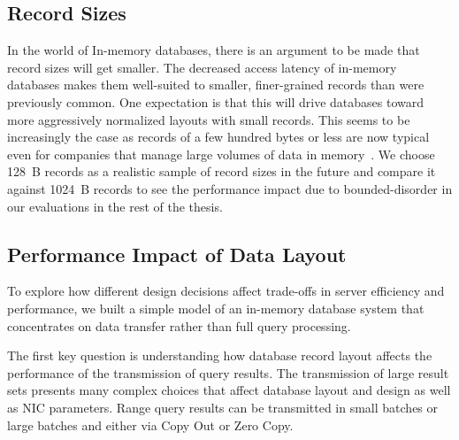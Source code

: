 \subsection{Record Sizes}
In the world of In-memory databases, there is an argument to be made that record sizes will get smaller.
The decreased access latency of in-memory databases makes them well-suited to smaller, finer-grained records
than were previously common. One expectation is that this will drive databases
toward more aggressively normalized layouts with small records. This
seems to be increasingly the case as records of a few hundred bytes or less
are now typical even for companies that manage large volumes of data in memory~\cite{fb-memcache,fb-workload,inmemoryworkload}. 
We choose 128~B records as a realistic sample of record sizes in the future and compare it against 
1024~B records to see the performance impact due to bounded-disorder in our evaluations in the rest of the thesis.



\subsection{Performance Impact of Data Layout}
\label{sec:zero-copy-tput}

%
To explore how different design decisions affect trade-offs in server efficiency and
performance, we built a simple model of an in-memory database system that
concentrates on data transfer rather than full query processing.

The first key question is understanding how database record layout affects the
performance of the transmission of query results.  The transmission of large
result sets presents many complex choices that affect
database layout and design as well as NIC parameters.  Range query
results can be transmitted in small batches or large batches and either via
Copy Out or Zero Copy.

